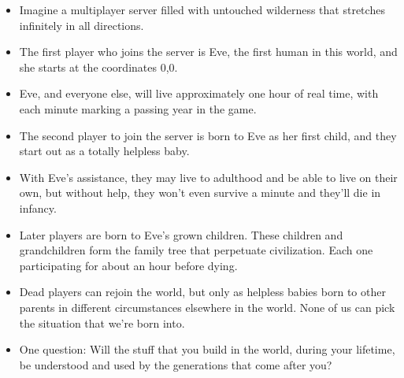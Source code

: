 \documentclass[12pt]{article}
\begin{document}
{\begin{itemize}
\item Imagine a multiplayer server filled with untouched wilderness that stretches infinitely in all directions.

\item The first player who joins the server is Eve, the first human in this world, and she starts at the coordinates 0,0.

\item Eve, and everyone else, will live approximately one hour of real time, with each minute marking a passing year in the game.

\item The second player to join the server is born to Eve as her first child, and they start out as a totally helpless baby.

\item With Eve's assistance, they may live to adulthood and be able to live on their own, but without help, they won't even survive a minute and they'll die in infancy.

\item Later players are born to Eve's grown children.  These children and grandchildren form the family tree that perpetuate civilization.  Each one participating for about an hour before dying.

\item Dead players can rejoin the world, but only as helpless babies born to other parents in different circumstances elsewhere in the world.  None of us can pick the situation that we're born into.

\item One question:  Will the stuff that you build in the world, during your lifetime, be understood and used by the generations that come after you?



\end{itemize}
}
\end{document}
